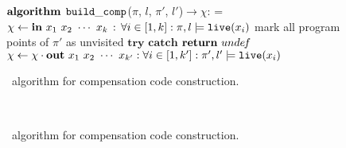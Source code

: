 \ifdefined\noauthorea
\begin{figure}[ht!]
\IncMargin{2em}
\begin{algorithm}[H]
\DontPrintSemicolon
\LinesNumbered
\SetAlgoNoLine
\SetNlSkip{1em} 
\Indm\Indmm
\hrulefill\\
\nonl\vspace{-2mm}\hrulefill\\
\nonl$\mathbf{algorithm} \> \> \text{${\tt build\_comp}$}$($\pi$, $l$, $\pi'$, $l'$)$\rightarrow\chi$:\;
\everypar={\nl}
\Indp\Indpp
\vspace{1mm} $\chi\gets \textbf{in}~x_1~x_2~\cdots~x_k\,:\,\forall i\in[1,k]:\pi,l \models \text{${\tt live}$}(x_i)$\;
mark all program points of $\pi'$ as unvisited\;
$\mathbf{try}$\;
\Indp
{}
\Indm
$\mathbf{catch}$\;
\Indp
$\mathbf{return}~unde\hspace{-0.1em}f$\;
\Indm
$\chi\gets \chi\cdot\textbf{out}~x_1~x_2~\cdots~x_{k'}:\forall i\in[1,k']:\pi',l'\models \text{${\tt live}$}(x_i)$\;
\Return{$\chi$}\;
\vspace{-2mm}
\Indm\Indmm
\nonl\hrulefill\vspace{1mm}\\
\IncMargin{1.5em}
\caption{\label{alg:osr-build-comp} \buildcomp\ algorithm for compensation code construction.}
\DecMargin{1.5em}
\end{algorithm} 
\end{figure}

\else
\begin{figure}
\noindent
\begin{small}
\algmissing \\
\end{small}
\caption{\buildcomp\ algorithm for compensation code construction.}
\label{alg:osr-build-comp}
\end{figure}
\fi


